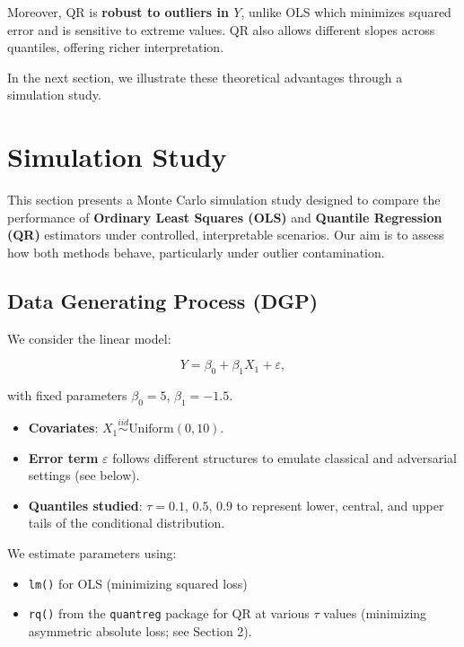 \documentclass[fleqn,8pt]{latex/stylish_article} %
\providecommand{\tightlist}{%
  \setlength{\itemsep}{0pt}\setlength{\parskip}{0pt}}
\begin{document}
Moreover, QR is \textbf{robust to outliers in \(Y\)}, unlike OLS which minimizes squared error and is sensitive to extreme values. QR also allows different slopes across quantiles, offering richer interpretation.

In the next section, we illustrate these theoretical advantages through a simulation study.

\section{Simulation Study}\label{simulation-study}

This section presents a Monte Carlo simulation study designed to compare the performance of \textbf{Ordinary Least Squares (OLS)} and \textbf{Quantile Regression (QR)} estimators under controlled, interpretable scenarios. Our aim is to assess how both methods behave, particularly under outlier contamination.

\subsection{Data Generating Process (DGP)}\label{data-generating-process-dgp}

We consider the linear model:

\[
Y = \beta_0 + \beta_1 X_1 + \varepsilon,
\]

with fixed parameters \(\beta_0 = 5\), \(\beta_1 = -1.5\).

\begin{itemize}
\tightlist
\item
  \textbf{Covariates}: \(X_1 \overset{iid}{\sim} \text{Uniform}(0,10)\).
\item
  \textbf{Error term} \(\varepsilon\) follows different structures to emulate classical and adversarial settings (see below).
\item
  \textbf{Quantiles studied}: \(\tau = 0.1\), \(0.5\), \(0.9\) to represent lower, central, and upper tails of the conditional distribution.
\end{itemize}

We estimate parameters using:

\begin{itemize}
\tightlist
\item
  \texttt{lm()} for OLS (minimizing squared loss)
\item
  \texttt{rq()} from the \texttt{quantreg} package for QR at various \(\tau\) values (minimizing asymmetric absolute loss; see Section 2).
\end{itemize}
\end{document}
